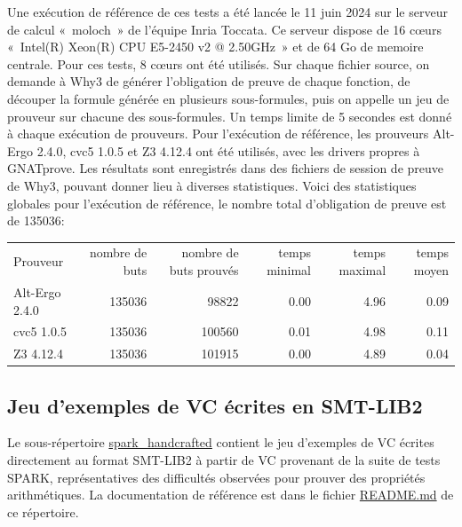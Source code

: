 \documentclass[a4paper,11pt]{article}
\begin{document}
Une exécution de référence de ces tests a été lancée le 11 juin 2024
sur le serveur de calcul «~moloch~» de l'équipe Inria Toccata. Ce
serveur dispose de 16 c{\oe}urs «~Intel(R) Xeon(R) CPU E5-2450 v2 @
2.50GHz~» et de 64 Go de memoire centrale. Pour ces tests, 8 c{\oe}urs
ont été utilisés. Sur chaque fichier source, on demande à Why3 de
générer l'obligation de preuve de chaque fonction, de découper la
formule générée en plusieurs sous-formules, puis on appelle un jeu de
prouveur sur chacune des sous-formules. Un temps limite de 5 secondes est donné à chaque exécution de prouveurs. Pour l'exécution de référence,
les prouveurs Alt-Ergo 2.4.0, cvc5 1.0.5 et Z3 4.12.4 ont
été utilisés, avec les drivers propres à GNATprove.
Les résultats sont enregistrés dans des fichiers de
session de preuve de Why3, pouvant donner lieu à diverses
statistiques. Voici des statistiques globales pour l'exécution de
référence, le nombre total d'obligation de preuve est de 135036:
\begin{center}
  \begin{tabular}{|l|r|r|r|r|r|}
    \hline
  \rowcolor{gray!50} Prouveur
  & \multicolumn{1}{p{0.13\textwidth}|}{nombre de buts}
  & \multicolumn{1}{p{0.13\textwidth}|}{nombre de buts prouvés}
  & \multicolumn{1}{p{0.13\textwidth}|}{temps minimal}
  & \multicolumn{1}{p{0.13\textwidth}|}{temps maximal}
  & \multicolumn{1}{p{0.13\textwidth}|}{temps moyen}
  \\
  Alt-Ergo 2.4.0                & 135036 &  98822 &  0.00  & 4.96 &  0.09 \\
  cvc5 1.0.5                    & 135036 & 100560 &  0.01  & 4.98 &  0.11 \\
  Z3 4.12.4                     & 135036 & 101915 &  0.00  & 4.89 &  0.04 \\
\hline
\end{tabular}
\end{center}

\subsection{Jeu d'exemples de VC écrites en SMT-LIB2}

Le sous-répertoire \url{spark_handcrafted} contient le jeu d'exemples de VC
écrites directement au format SMT-LIB2 à partir de VC provenant de la suite de
tests SPARK, représentatives des difficultés observées pour prouver des
propriétés arithmétiques. La documentation de référence est dans le fichier
\url{README.md} de ce répertoire.
\end{document}
